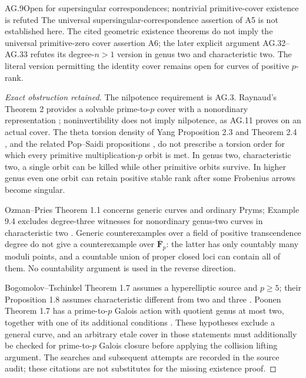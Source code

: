 \begin{claim}{AG.9}{Open for supersingular correspondences; nontrivial primitive-cover existence is refuted}
The universal supersingular-correspondence assertion of A5
is not established here. The cited geometric existence
theorems do not imply the universal primitive-zero cover
assertion A6; the later explicit argument AG.32--AG.33
refutes its degree-$n>1$ version in genus two and
characteristic two. The literal version permitting the
identity cover remains open for curves of positive $p$-rank.
\end{claim}
\begin{proof}[Exact obstruction retained]
The nilpotence requirement is AG.3. Raynaud's Theorem 2
provides a solvable prime-to-$p$ cover with a nonordinary
representation \cite{AG_Raynaud2000}; noninvertibility
does not imply nilpotence, as AG.11 proves on an actual cover. The theta torsion
density of Yang Proposition 2.3 and Theorem 2.4
\cite{AG_Yang2016}, and the related Pop--Saidi propositions
\cite{AG_PopSaidi2003}, do not prescribe a torsion order for
which every primitive multiplication-$p$ orbit is met.
In genus two, characteristic two, a single orbit can be
killed while other primitive orbits survive. In higher
genus even one orbit can retain positive stable rank after
some Frobenius arrows become singular.

Ozman--Pries Theorem 1.1 concerns generic curves and ordinary
Pryms; Example 9.4 excludes degree-three witnesses for
nonordinary genus-two curves in characteristic two
\cite{AG_OzmanPries2019}. Generic counterexamples over a
field of positive transcendence degree do not give a
counterexample over $\overline{\mathbf F}_p$: the latter
has only countably many moduli points, and a countable
union of proper closed loci can contain all of them.
No countability argument is used in the reverse direction.

Bogomolov--Tschinkel Theorem 1.7 assumes a hyperelliptic
source and $p\ge5$; their Proposition 1.8 assumes
characteristic different from two and three
\cite{AG_BogomolovTschinkel2002}. Poonen Theorem 1.7 has
a prime-to-$p$ Galois action with quotient genus at most
two, together with one of its additional conditions
\cite{AG_Poonen2005}. These hypotheses exclude a general
curve, and an arbitrary etale cover in those statements
must additionally be checked for prime-to-$p$ Galois
closure before applying the collision lifting argument.
The searches and subsequent attempts are recorded in the
source audit; these citations are not substitutes for the
missing existence proof.
\end{proof}

